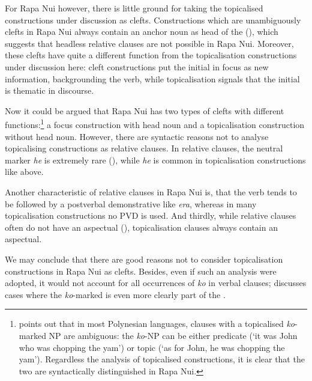 For Rapa Nui however, there is little ground for taking the topicalised constructions under discussion as clefts. Constructions which are unambiguously clefts in Rapa Nui always contain an anchor noun as head of the  (), which suggests that headless relative clauses are not possible in Rapa Nui. Moreover, these clefts have quite a different function from the topicalisation constructions under discussion here: cleft constructions put the initial  in focus as new information, backgrounding the verb, while topicalisation signals that the initial  is thematic in discourse. 

Now it could be argued that Rapa Nui has two types of clefts with different functions:\footnote{\label{fn:426}\citet[38]{Clark1976} points out that in most Polynesian languages, clauses with a topicalised \textit{ko}{}-marked NP are ambiguous: the \textit{ko}{}-NP can be either predicate (‘it was John who was chopping the yam’) or topic (‘as for John, he was chopping the yam’). Regardless the analysis of topicalised constructions, it is clear that the two are syntactically distinguished in Rapa Nui.} a focus construction with head noun and a topicalisation construction without head noun. However, there are syntactic reasons not to analyse topicalising constructions as relative clauses. In relative clauses, the neutral  marker \textit{he} is extremely rare (), while \textit{he} is common in topicalisation constructions like  above. 

Another characteristic of relative clauses in Rapa Nui is, that the verb tends to be followed by a postverbal demonstrative like \textit{era}, whereas in many topicalisation constructions no PVD is used. And thirdly, while relative clauses often do not have an aspectual (), topicalisation clauses always contain an aspectual.

We may conclude that there are good reasons not to consider topicalisation constructions in Rapa Nui as clefts. Besides, even if such an analysis were adopted, it would not account for all occurrences of \textit{ko} in verbal clauses;  discusses cases where the \textit{ko}{}-marked  is even more clearly part of the .

